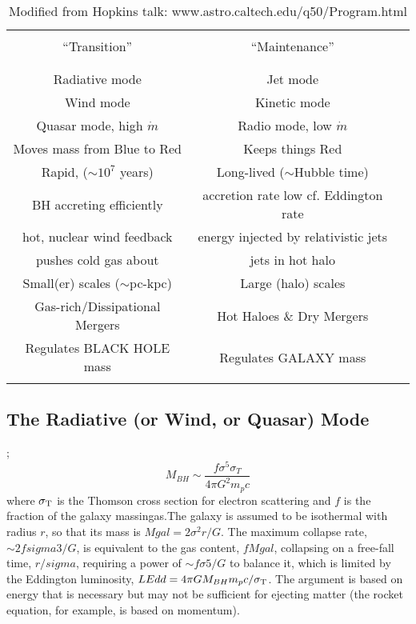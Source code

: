 \documentclass[11pt,a4paper]{article}
\begin{document}
\begin{table}[]
  \centering
  \begin{tabular}{c cl}
    \hline
    \hline
     & \\
    ``Transition''                              &  ``Maintenance''  \\
     & \\
    \hline
     & \\
    Radiative mode                           & Jet mode \\
    Wind mode                                  & Kinetic mode \\
    Quasar mode, high $\dot{m}$     &  Radio mode, low $\dot{m}$ \\
    Moves mass from Blue to Red      &  Keeps things Red\\
    Rapid, ($\sim10^7$ years)           & Long-lived ($\sim$Hubble time)\\
    BH accreting efficiently                & accretion rate low cf. Eddington rate \\
    hot, nuclear wind feedback          & energy injected by relativistic jets \\ 
    pushes cold gas about                  & jets in hot halo \\
    Small(er) scales ($\sim$pc-kpc)  & Large (halo) scales \\
    Gas-rich/Dissipational Mergers   & Hot Haloes \& Dry Mergers \\
    Regulates BLACK HOLE mass        & Regulates GALAXY mass \\
     & \\
    \hline
    \hline
\end{tabular}
    \caption{Modified from Hopkins talk: www.astro.caltech.edu/q50/Program.html}
    \label{tab:modes}
\end{table}

\subsection{The Radiative (or Wind, or Quasar) Mode} 
\citep[from ][]{Fabian2012}; \\

\begin{equation}
M_{BH} \sim \frac{f \sigma^5 \sigma_T}{4 \pi G^2 m_p c}
\end{equation}
where $\sigma_{\rm T}$ is the Thomson cross section for electron
scattering and $f$ is the fraction of the galaxy massingas.The galaxy
is assumed to be isothermal with radius $r$, so that its mass is $Mgal
=2 \sigma^2 r / G$. The maximum collapse rate, $\sim 2f sigma 3/G$, is
equivalent to the gas content, $f Mgal$, collapsing on a free-fall
time, $r/sigma $, requiring a power of $\sim f \sigma 5/G$ to balance
it, which is limited by the Eddington luminosity, $LEdd = 4 \pi G
M_{BH} m_p c / \sigma_{\rm T}$. The argument is based on energy that
is necessary but may not be sufficient for ejecting matter (the rocket
equation, for example, is based on momentum).
\end{document}

